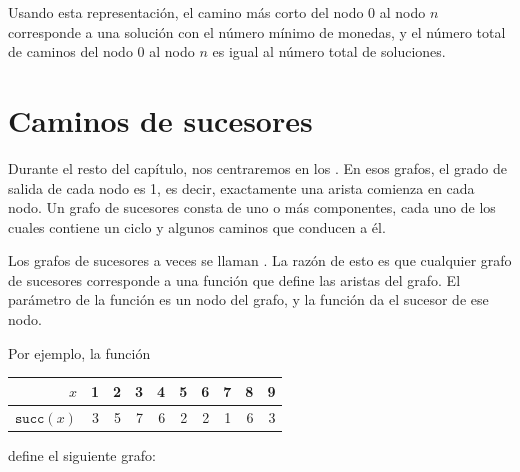 Usando esta representación,
el camino más corto del nodo 0 al nodo $n$
corresponde a una solución con el número mínimo de monedas,
y el número total de caminos del nodo 0 al nodo $n$
es igual al número total de soluciones.

\section{Caminos de sucesores}


Durante el resto del capítulo,
nos centraremos en los .
En esos grafos,
el grado de salida de cada nodo es 1, es decir,
exactamente una arista comienza en cada nodo.
Un grafo de sucesores consta de uno o más
componentes, cada uno de los cuales contiene
un ciclo y algunos caminos que conducen a él.

Los grafos de sucesores a veces se llaman
.
La razón de esto es que cualquier grafo de sucesores
corresponde a una función que define
las aristas del grafo.
El parámetro de la función es un nodo del grafo,
y la función da el sucesor de ese nodo.

Por ejemplo, la función
\begin{center}
\begin{tabular}{r|rrrrrrrrr}
$x$ & 1 & 2 & 3 & 4 & 5 & 6 & 7 & 8 & 9 \\
\hline
$\texttt{succ}(x)$ & 3 & 5 & 7 & 6 & 2 & 2 & 1 & 6 & 3 \\
\end{tabular}
\end{center}
define el siguiente grafo:
\begin{center}
\end{center}

